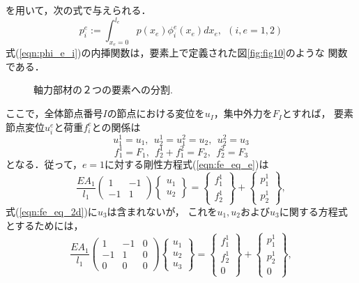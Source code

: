 \documentclass[10pt,a4j]{jarticle}
\begin{document}
を用いて，次の式で与えられる．
\begin{equation}
	p^e_i:=\int_{x_e=0}^{l_e}p(x_e)\phi^e_i(x_e)dx_e, \ \ (i,e=1,2)
\end{equation}
式(\ref{eqn:phi_e_i})の内挿関数は，要素上で定義された図\ref{fig:fig10}のような
関数である．\\
\begin{figure}[h]
	\begin{center}
	\end{center}
	\caption{軸力部材の２つの要素への分割.} 
	\label{fig:fig6}
\end{figure}

ここで，全体節点番号$I$の節点における変位を$u_I$，集中外力を$F_I$とすれば，
要素節点変位$u^e_i$と荷重$f^e_i$との関係は
\begin{equation}
	u^1_1=u_1, \ \ u^1_2=u^2_1=u_2, \ \ u^2_2=u_3
	\label{eqn:ui2uI}
\end{equation}
\begin{equation}
	f^1_1=F_1, \ \ f^1_2+f^2_1=F_2, \ \ f^2_2=F_3
	\label{eqn:fi2FI}
\end{equation}
となる．従って，$e=1$に対する剛性方程式(\ref{eqn:fe_eq_e})は
\begin{equation}
	\frac{EA_1}{l_1}
	\left(
	\begin{array}{cc}
		1 & -1  \\
		-1 & 1 
	\end{array}
	\right)
	\left\{
	\begin{array}{c}
		u_1 \\
		u_2 
	\end{array}
	\right\}
	=
	\left\{
	\begin{array}{c}
		f^1_1  \\
		f^1_2 
	\end{array}
	\right\}
	+
	\left\{
	\begin{array}{c}
		p^1_1 \\
		p^1_2 
	\end{array}
	\right\}, 
	\label{eqn:fe_eq_1_2d}
\end{equation}
式(\ref{eqn:fe_eq_2d})に$u_3$は含まれないが，
これを$u_1,u_2$および$u_3$に関する方程式とするためには，
\begin{equation}
	\frac{EA_1}{l_1}
	\left(
	\begin{array}{ccc}
		1 & -1 & 0 \\
		-1 & 1  & 0 \\
		0 & 0  & 0 
	\end{array}
	\right)
	\left\{
	\begin{array}{c}
		u_1 \\
		u_2 \\
		u_3
	\end{array}
	\right\}
	=
	\left\{
	\begin{array}{c}
		f^1_1  \\
		f^1_2  \\
		0
	\end{array}
	\right\}
	+
	\left\{
	\begin{array}{c}
		p^1_1 \\
		p^1_2 \\
		0
	\end{array}
	\right\}, 
	\label{eqn:fe_eq_1}
\end{equation}
\end{document}
